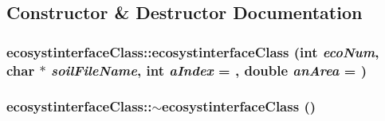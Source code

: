\subsection{Constructor \& Destructor Documentation}
\hypertarget{classecosystinterface_class_a5287dbc93b0992c1cef956b22cd20c6b}{
\subsubsection[{ecosystinterfaceClass}]{\setlength{\rightskip}{0pt plus 5cm}ecosystinterfaceClass::ecosystinterfaceClass (int {\em ecoNum}, \/  char $\ast$ {\em soilFileName}, \/  int {\em aIndex} = {}, \/  double {\em anArea} = {})}}
\label{classecosystinterface_class_a5287dbc93b0992c1cef956b22cd20c6b}
\hypertarget{classecosystinterface_class_ace2e9be8342e652c70db7ad887fa72c0}{
\subsubsection[{$\sim$ecosystinterfaceClass}]{\setlength{\rightskip}{0pt plus 5cm}ecosystinterfaceClass::$\sim$ecosystinterfaceClass ()}}
\label{classecosystinterface_class_ace2e9be8342e652c70db7ad887fa72c0}


